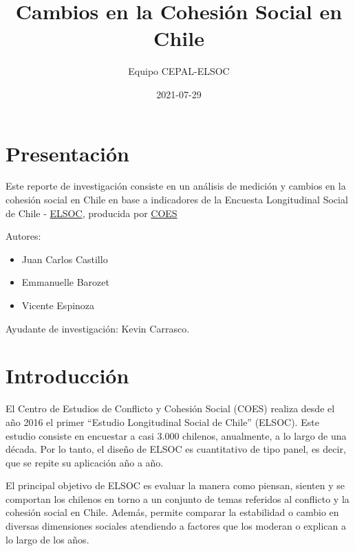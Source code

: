 \documentclass[
  12pt,
]{book}
\title{Cambios en la Cohesión Social en Chile}
\author{Equipo CEPAL-ELSOC}
\date{2021-07-29}
\providecommand{\tightlist}{%
  \setlength{\itemsep}{0pt}\setlength{\parskip}{0pt}}
\begin{document}
\maketitle

{
\hypersetup{linkcolor=}
\setcounter{tocdepth}{1}
\tableofcontents
}
\listoftables
\listoffigures
{}
\hypertarget{presentaciuxf3n}{%
\chapter*{Presentación}\label{presentaciuxf3n}}

Este reporte de investigación consiste en un análisis de medición y cambios en la cohesión social en Chile en base a indicadores de la Encuesta Longitudinal Social de Chile - \href{https://coes.cl/encuesta-panel/}{ELSOC}, producida por \href{https://coes.cl/}{COES}

Autores:

\begin{itemize}
\tightlist
\item
  Juan Carlos Castillo
\item
  Emmanuelle Barozet
\item
  Vicente Espinoza
\end{itemize}

Ayudante de investigación: Kevin Carrasco.

\hypertarget{introducciuxf3n}{%
\chapter*{Introducción}\label{introducciuxf3n}}

El Centro de Estudios de Conflicto y Cohesión Social (COES) realiza desde el año 2016 el primer ``Estudio Longitudinal Social de Chile'' (ELSOC). Este estudio consiste en encuestar a casi 3.000 chilenos, anualmente, a lo largo de una década. Por lo tanto, el diseño de ELSOC es cuantitativo de tipo panel, es decir, que se repite su aplicación año a año.

El principal objetivo de ELSOC es evaluar la manera como piensan, sienten y se comportan los chilenos en torno a un conjunto de temas referidos al conflicto y la cohesión social en Chile. Además, permite comparar la estabilidad o cambio en diversas dimensiones sociales atendiendo a factores que los moderan o explican a lo largo de los años.
\end{document}
